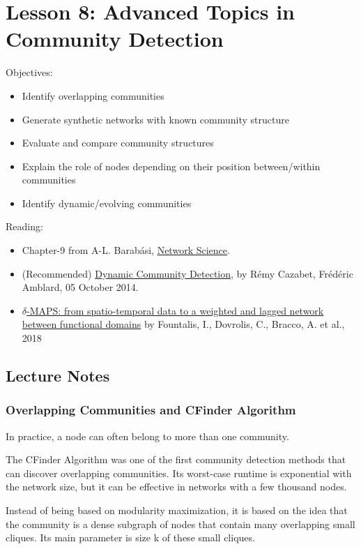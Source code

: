 \documentclass[11pt]{scrartcl} %
\begin{document}
\section{Lesson 8: Advanced Topics in Community Detection}

Objectives:
\begin{itemize}
	\item Identify overlapping communities
	\item Generate synthetic networks with known community structure
	\item Evaluate and compare community structures
	\item Explain the role of nodes depending on their position between/within communities
	\item Identify dynamic/evolving communities
\end{itemize}

Reading:
\begin{itemize}
	\item Chapter-9 from A-L. Barabási, \href{http://networksciencebook.com/}{Network Science}.
	\item (Recommended) \href{http://\%20https//doi.org/10.1007/978-1-4614-6170-8_383}{Dynamic Community Detection}, by Rémy Cazabet, Frédéric Amblard, 05 October 2014.
	\item \href{https://link.springer.com/article/10.1007/s41109-018-0078-z}{$\delta$-MAPS: from spatio-temporal data to a weighted and lagged network between functional domains} by Fountalis, I., Dovrolis, C., Bracco, A. et al., 2018
\end{itemize}

\subsection{Lecture Notes}

\subsubsection{Overlapping Communities and CFinder Algorithm}
In practice, a node can often belong to more than one community.

The CFinder Algorithm was one of the first community detection methods that can discover overlapping communities. Its worst-case runtime is exponential with the network size, but it can be effective in networks with a few thousand nodes.

Instead of being based on modularity maximization, it is based on the idea that the community is a dense subgraph of nodes that contain many overlapping small cliques. Its main parameter is size k of these small cliques. 
\end{document}
